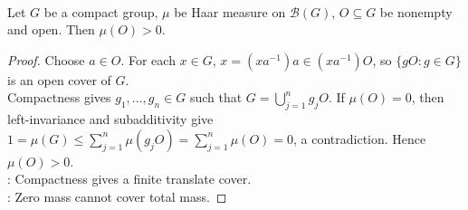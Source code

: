 \begin{proposition} \label{prop:haar-positive-on-nonempty-open-sets} \\
Let $G$ be a compact group, $\mu$ be Haar measure on $\mathcal{B}(G)$, $O\subseteq G$ be nonempty and open. Then $\mu(O)>0$.
\begin{proof} Choose $a\in O$. For each $x\in G$, $x=(xa^{-1})a\in(xa^{-1})O$, so $\{gO:g\in G\}$ is an open cover of $G$.\\
Compactness gives $g_1,\ldots,g_n\in G$ such that $G=\bigcup_{j=1}^{n}g_jO$. If $\mu(O)=0$, then left-invariance and subadditivity give $1=\mu(G)\leq\sum_{j=1}^{n}\mu(g_jO)=\sum_{j=1}^{n}\mu(O)=0$, a contradiction. Hence $\mu(O)>0$.\\
: Compactness gives a finite translate cover.\\
: Zero mass cannot cover total mass.
\end{proof}
\end{proposition}
